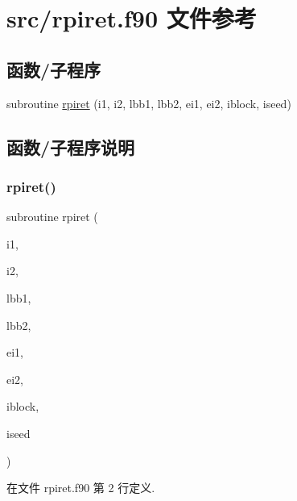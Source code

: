 \hypertarget{rpiret_8f90}{}\section{src/rpiret.f90 文件参考}
\label{rpiret_8f90}
\subsection*{函数/子程序}
\begin{DoxyCompactItemize}
\item 
subroutine \mbox{\hyperlink{rpiret_8f90_af59b6f041526aba771e73746b2ee508e}{rpiret}} (i1, i2, lbb1, lbb2, ei1, ei2, iblock, iseed)
\end{DoxyCompactItemize}


\subsection{函数/子程序说明}
\mbox{\label{rpiret_8f90_af59b6f041526aba771e73746b2ee508e}} 
\subsubsection{\texorpdfstring{rpiret()}{rpiret()}}
{\footnotesize\ttfamily subroutine rpiret (\begin{DoxyParamCaption}\item[{}]{i1,  }\item[{}]{i2,  }\item[{}]{lbb1,  }\item[{}]{lbb2,  }\item[{}]{ei1,  }\item[{}]{ei2,  }\item[{}]{iblock,  }\item[{}]{iseed }\end{DoxyParamCaption})}



在文件 rpiret.\+f90 第 2 行定义.

